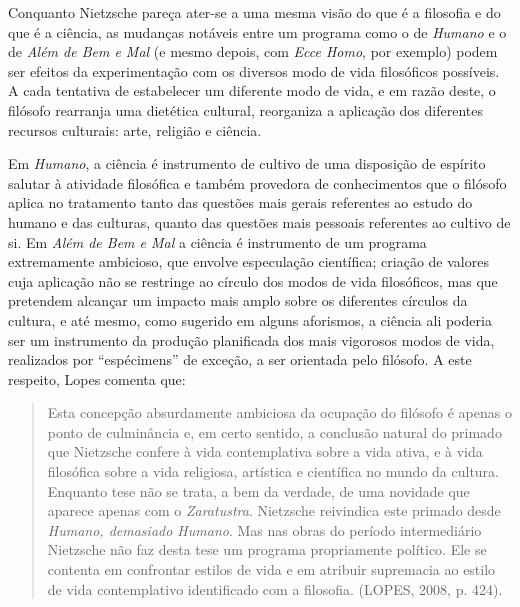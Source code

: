 \documentclass[
	12pt,				%
	openright,			%
	oneside,			%
	a4paper,			%
	english,			%
	french,				%
	spanish,			%
	brazil				%
	]{abntex2}
\begin{document}
	Conquanto Nietzsche pareça ater-se a uma mesma visão do que é a filosofia e do que é a ciência, as mudanças notáveis entre um programa como o de \textit{Humano} e o de \textit{Além de Bem e Mal} (e mesmo depois, com \textit{Ecce Homo}, por exemplo) podem ser efeitos da experimentação com os diversos modo de vida filosóficos possíveis. A cada tentativa de estabelecer um diferente modo de vida, e em razão deste, o filósofo rearranja uma dietética cultural, reorganiza a aplicação dos diferentes recursos culturais: arte, religião e ciência.

Em \textit{Humano}, a ciência é instrumento de cultivo de uma disposição de espírito salutar à atividade filosófica e também provedora de conhecimentos que o filósofo aplica no tratamento tanto das questões mais gerais referentes ao estudo do humano e das culturas, quanto das questões mais pessoais referentes ao cultivo de si. Em \textit{Além de Bem e Mal} a ciência é instrumento de um programa extremamente ambicioso, que envolve especulação científica; criação de valores cuja aplicação não se restringe ao círculo dos modos de vida filosóficos, mas que pretendem alcançar um impacto mais amplo sobre os diferentes círculos da cultura, e até mesmo, como sugerido em alguns aforismos, a ciência ali poderia ser um instrumento da produção planificada dos mais vigorosos modos de vida, realizados por “espécimens” de exceção, a ser orientada pelo filósofo. A este respeito, Lopes comenta que:

\begin{quotation}
Esta concepção absurdamente ambiciosa da ocupação do filósofo é apenas o ponto de culminância e, em certo sentido, a conclusão natural do primado que Nietzsche confere à vida contemplativa sobre a vida ativa, e à vida filosófica sobre a vida religiosa, artística e científica no mundo da cultura. Enquanto tese não se trata, a bem da verdade, de uma novidade que aparece apenas com o \textit{Zaratustra}. Nietzsche reivindica este primado desde \textit{Humano, demasiado Humano}. Mas nas obras do período intermediário Nietzsche não faz desta tese um programa propriamente político. Ele se contenta em confrontar estilos de vida e em atribuir supremacia ao estilo de vida contemplativo identificado com a filosofia. (LOPES, 2008, p. 424).
\end{quotation}
\end{document}
